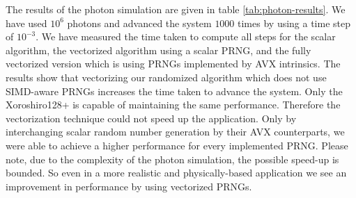 \documentclass{stdlocal}
\begin{document}
    The results of the photon simulation are given in table \ref{tab:photon-results}.
    We have used $10^6$ photons and advanced the system $1000$ times by using a time step of $10^{-3}$.
    We have measured the time taken to compute all steps for the scalar algorithm, the vectorized algorithm using a scalar PRNG, and the fully vectorized version which is using PRNGs implemented by AVX intrinsics.
    The results show that vectorizing our randomized algorithm which does not use SIMD-aware PRNGs increases the time taken to advance the system.
    Only the Xoroshiro128+ is capable of maintaining the same performance.
    Therefore the vectorization technique could not speed up the application.
    Only by interchanging scalar random number generation by their AVX counterparts, we were able to achieve a higher performance for every implemented PRNG.
    Please note, due to the complexity of the photon simulation, the possible speed-up is bounded.
    So even in a more realistic and physically-based application we see an improvement in performance by using vectorized PRNGs.
\end{document}
